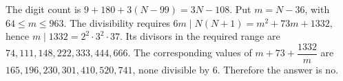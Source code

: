 The digit count is $9+180+3(N-99)=3N-108$. Put $m=N-36$, with $64\le m\le963$. The divisibility requires $6m\mid N(N+1)=m^2+73m+1332$, hence $m\mid1332=2^2\cdot3^2\cdot37$. Its divisors in the required range are $74,111,148,222,333,444,666$. The corresponding values of $m+73+\dfrac{1332}{m}$ are $165,196,230,301,410,520,741$, none divisible by $6$. Therefore the answer is $\boxed{\text{no}}$.
